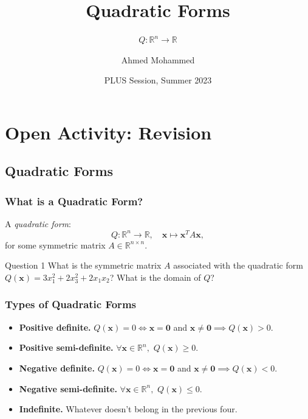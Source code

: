 \documentclass{beamer}
\title{Quadratic Forms}
\subtitle{\(Q \colon \mathbb{R}^n \to \mathbb{R}\)}
\author{Ahmed Mohammed}
\institute{Georgia Institute of Technology}
\date{PLUS Session, Summer 2023}
\renewcommand{\vec}[1]{\bm{#1}}
\begin{document}
	\begin{frame}
		\maketitle
	\end{frame}

	\section{Open Activity: Revision}
	\subsection{Quadratic Forms}
	\begin{frame}
		\frametitle{What is a Quadratic Form?}
		A \emph{quadratic form}:\pause
		\[Q \colon \mathbb{R}^n \to \mathbb{R}, \quad \vec{x} \mapsto \vec{x}^TA\vec{x},\] for some symmetric matrix 
		\(A \in \mathbb{R}^{n \times n}\). \pause
		
		\begin{exampleblock}{Question 1}
			What is the symmetric matrix \(A\) associated with the quadratic form \(Q(\vec{x}) = 3x^2_1 + 2x_3^2 + 2x_1x_2\)? What is the domain
			of \(Q\)?
		\end{exampleblock}
	\end{frame}
	
	\begin{frame}
		\frametitle{Types of Quadratic Forms}
		\begin{itemize}[<alert@+>]
			\item \textbf{Positive definite.} \(Q(\vec{x})  = 0 \iff \vec{x} = \vec{0}\) and \(\vec{x} \ne \vec{0} \implies Q(\vec{x}) > 0\).
			\item \textbf{Positive semi-definite.} \(\forall \vec{x} \in \mathbb{R}^n,\) \(Q(\vec{x}) \ge 0\).
			\item \textbf{Negative definite.} \(Q(\vec{x})  = 0 \iff \vec{x} = \vec{0}\) and \(\vec{x} \ne \vec{0} \implies Q(\vec{x}) < 0\).
			\item \textbf{Negative semi-definite.} \(\forall \vec{x} \in \mathbb{R}^n,\) \(Q(\vec{x}) \le 0\).
			\item \textbf{Indefinite.} Whatever doesn't belong in the previous four.
		\end{itemize}
	\end{frame}
\end{document}
